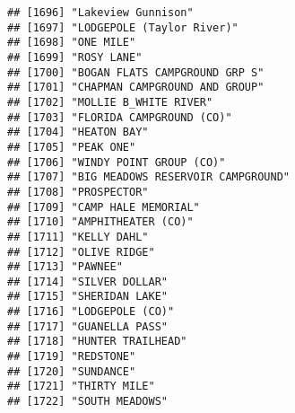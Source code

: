\documentclass[
]{article}
\begin{document}
\begin{verbatim}
## [1696] "Lakeview Gunnison"                                                                   
## [1697] "LODGEPOLE (Taylor River)"                                                            
## [1698] "ONE MILE"                                                                            
## [1699] "ROSY LANE"                                                                           
## [1700] "BOGAN FLATS CAMPGROUND GRP S"                                                        
## [1701] "CHAPMAN CAMPGROUND AND GROUP"                                                        
## [1702] "MOLLIE B_WHITE RIVER"                                                                
## [1703] "FLORIDA CAMPGROUND (CO)"                                                             
## [1704] "HEATON BAY"                                                                          
## [1705] "PEAK ONE"                                                                            
## [1706] "WINDY POINT GROUP (CO)"                                                              
## [1707] "BIG MEADOWS RESERVOIR CAMPGROUND"                                                    
## [1708] "PROSPECTOR"                                                                          
## [1709] "CAMP HALE MEMORIAL"                                                                  
## [1710] "AMPHITHEATER (CO)"                                                                   
## [1711] "KELLY DAHL"                                                                          
## [1712] "OLIVE RIDGE"                                                                         
## [1713] "PAWNEE"                                                                              
## [1714] "SILVER DOLLAR"                                                                       
## [1715] "SHERIDAN LAKE"                                                                       
## [1716] "LODGEPOLE (CO)"                                                                      
## [1717] "GUANELLA PASS"                                                                       
## [1718] "HUNTER TRAILHEAD"                                                                    
## [1719] "REDSTONE"                                                                            
## [1720] "SUNDANCE"                                                                            
## [1721] "THIRTY MILE"                                                                         
## [1722] "SOUTH MEADOWS"                                                                       

\end{verbatim}
\end{document}
